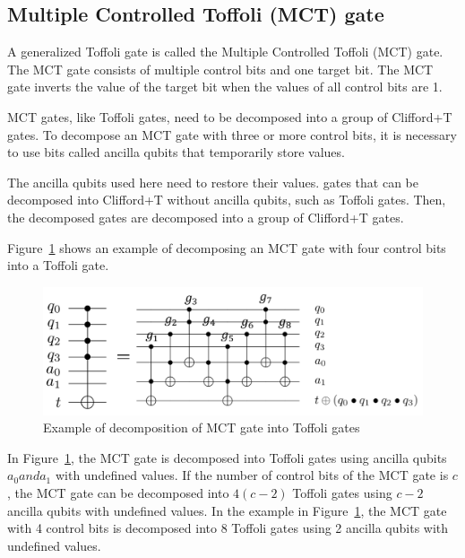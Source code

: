 \subsection{Multiple Controlled Toffoli (MCT) gate}

A generalized Toffoli gate is called the Multiple Controlled Toffoli (MCT) gate\cite{barenco1995elementary}.
The MCT gate consists of multiple control bits and one target bit.
The MCT gate inverts the value of the target bit when the values of all control bits are 1.

MCT gates, like Toffoli gates, need to be decomposed into a group of Clifford+T gates.
To decompose an MCT gate with three or more control bits,
it is necessary to use bits called ancilla qubits that temporarily store values.

The ancilla qubits used here need to restore their values.
gates that can be decomposed into Clifford+T without ancilla qubits,
such as Toffoli gates. 
Then, the decomposed gates are decomposed into a group of Clifford+T gates.
\par
Figure~\ref{barenco} shows an example of decomposing an MCT gate with four control bits into a Toffoli gate.
\begin{figure}[tbp]
\centering
\includegraphics[width=0.95\linewidth]{img/barenco.pdf}
\caption{Example of decomposition of MCT gate into Toffoli gates}
\label{barenco}
\end{figure}
In Figure~\ref{barenco}, the MCT gate is decomposed into Toffoli gates using ancilla qubits $a_{0} and a_{1}$ with undefined values.
If the number of control bits of the MCT gate is $c$, the MCT gate can be decomposed into $4(c-2)$ Toffoli gates using $c-2$ ancilla qubits with undefined values\cite{barenco1995elementary}.
In the example in Figure~\ref{barenco}, the MCT gate with 4 control bits is decomposed into 8 Toffoli gates using 2 ancilla qubits with undefined values.

